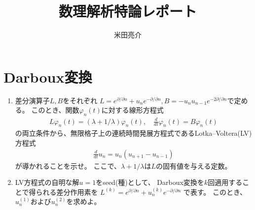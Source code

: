\documentclass{jsarticle}
\begin{document}
\title{数理解析特論レポート}
\author{米田亮介}
\maketitle
\section{Darboux変換}
\begin{shaded}
\begin{enumerate}
\item 差分演算子$L,B$をそれぞれ
$L=e^{\partial/\partial n}+u_{n}e^{-\partial/\partial n},
B=-u_{n}u_{n-1}e^{-2\partial/\partial n}$で定める。
このとき、関数$\varphi_{n}(t)$に対する線形方程式
\begin{eqnarray}
L\varphi_{n}(t)=(\lambda+1/\lambda)\varphi_{n}(t),\quad
\frac{d}{dt}\varphi_{n}(t)=B\varphi_{n}(t)
\end{eqnarray}
の両立条件から、無限格子上の連続時間発展方程式であるLotka--Voltera(LV)方程式
\begin{eqnarray}
\frac{d}{dt}u_{n}=u_{n}(u_{n+1}-u_{n-1})
\end{eqnarray}
が導かれることを示せ。
ここで、$\lambda+1/\lambda$は$L$の固有値を与える定数。
\item LV方程式の自明な解$u=1$をseed(種)として、
Darboux変換を$k$回適用することで得られる差分作用素を
$L^{(k)}=e^{\partial/\partial n}+u_{n}^{(k)}e^{-\partial/\partial n}$
で表す。
このとき、$u_{n}^{(1)}$および$u_{n}^{(2)}$を求めよ。
\end{enumerate}
\end{shaded}
\end{document}
